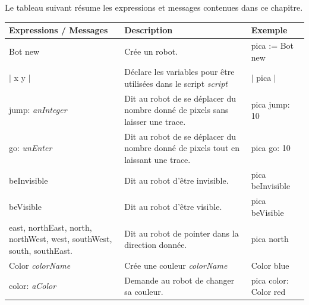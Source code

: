 \documentclass[a4paper,10pt,twoside]{book}
\begin{document}
Le tableau suivant r\'esume les expressions et messages contenues dans ce chapitre. 

\noindent
\setlength{\extrarowheight}{1mm}
{\small \begin{tabular}{p{30mm}p{50mm}p{30mm}}
\hline
\textbf{Expressions / Messages}&\textbf{Description}&\textbf{Exemple}\\\hline
\textsf{Bot new}&Cr\'ee un robot. &\textsf{pica := Bot new}\\
\textsf{$|$ x y $|$}
&
D\'eclare les variables pour \^etre 
utilis\'ees dans le script \emph{script}
&
\textsf{$|$ pica $|$}
\\
\textsf{jump: {\itshape anInteger}}
&

Dit au robot de se d\'eplacer 
du nombre donn\'e de pixels 
sans laisser une trace. 

&
\textsf{pica jump: 10}
\\
\textsf{go: {\itshape unEnter}}
&

Dit au robot de se d\'eplacer 
du nombre donn\'e de pixels 
tout en laissant une trace. 

&
\textsf{pica go: 10}
\\
\textsf{beInvisible}
&
Dit au robot d'\^etre invisible.
&
\textsf{pica beInvisible}
\\
\textsf{beVisible}
&
Dit au robot d'\^etre visible.
&
\textsf{pica beVisible}
\\
\textsf{east, northEast, north, northWest, west, southWest, south, southEast.}
&

Dit au robot de pointer dans 
la direction donn\'ee. 

&
\textsf{pica north}
\\
\textsf{Color {\itshape colorName}}
&
Cr\'ee une couleur \textit{colorName}
&
\textsf{Color blue}
\\
\textsf{color: {\itshape aColor}}
&
Demande au robot de changer sa couleur.
&
\textsf{pica color: Color red}
\\
\hline
\end{tabular}}


	
\ifx\wholebook\relax\else
    
\end{document}
